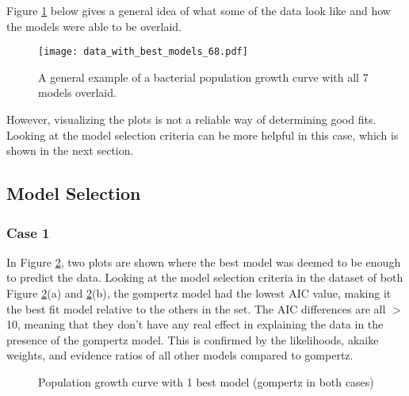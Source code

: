 \documentclass[11pt]{article}
\begin{document}
\begin{linenumbers}
	\par Figure \ref{tab:figure_68} below gives a general idea of what some of the data look like and how the models were able to be overlaid.
	
	\begin{figure}
		\centering
		\texttt{[image: data\_with\_best\_models\_68.pdf]}
		\caption{A general example of a bacterial population growth curve with all 7 models overlaid.}
		\label{tab:figure_68}
	\end{figure}

	\par However, visualizing the plots is not a reliable way of determining good fits. Looking at the model selection criteria can be more helpful in this case, which is shown in the next section.
	
	\subsection{Model Selection}

	\subsubsection{Case 1}
	In Figure \ref{tab:figure_52_146}, two plots are shown where the best model was deemed to be enough to predict the data. Looking at the model selection criteria in the dataset of both Figure \ref{tab:figure_52_146}(a) and \ref{tab:figure_52_146}(b), the gompertz model had the lowest AIC value, making it the best fit model relative to the others in the set. The AIC differences are all $>$ 10, meaning that they don't have any real effect in explaining the data in the presence of the gompertz model. This is confirmed by the likelihoods, akaike weights, and evidence ratios of all other models compared to gompertz.
	
	\begin{figure}
		\centering
		\qquad
		\caption{Population growth curve with 1 best model (gompertz in both cases)}
		\label{tab:figure_52_146}
	\end{figure}


\end{linenumbers}
\end{document}
